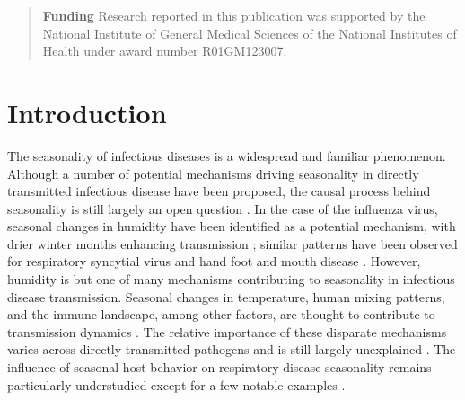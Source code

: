 \documentclass{article}
\begin{document}
\begin{abstract}
\vspace{0.05in}
\noindent \textbf{Funding} Research reported in this publication was supported by the National Institute of General Medical Sciences of the National Institutes of Health under award number R01GM123007.

\end{abstract}

\section{Introduction}

The seasonality of infectious diseases is a widespread and familiar phenomenon. Although a number of potential mechanisms driving seasonality in directly transmitted infectious disease have been proposed, the causal process behind seasonality is still largely an open question \cite{martinez2018calendar, altizer2006seasonality, grassly2006seasonal}. In the case of the influenza virus, seasonal changes in humidity have been identified as a potential mechanism, with drier winter months enhancing transmission \cite{shaman2009absolute, shaman2010absolute, dalziel2018urbanization}; similar patterns have been observed for respiratory syncytial virus and hand foot and mouth disease \cite{baker2019epidemic, onozuka2011influence}. However, humidity is but one of many mechanisms contributing to seasonality in infectious disease transmission. Seasonal changes in temperature, human mixing patterns, and the immune landscape, among other factors, are thought to contribute to transmission dynamics \cite{metcalf2009seasonality, mossong2008social, kronfeld2021drivers, bakker2021exploring, altizer2006seasonality}. The relative importance of these disparate mechanisms varies across directly-transmitted pathogens and is still largely unexplained \cite{martinez2018calendar, grassly2006seasonal}. The influence of seasonal host behavior on respiratory disease seasonality remains particularly understudied \cite{fisman2012seasonality, kronfeld2021drivers} except for a few notable examples \cite{bharti2011explaining,few2013seasonality, kummer2022measuring}.
\end{document}
